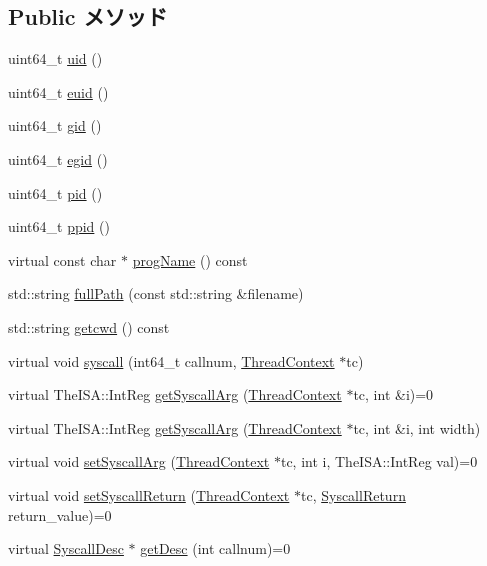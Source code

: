 \subsection*{Public メソッド}
\begin{DoxyCompactItemize}
\item 
uint64\_\-t \hyperlink{classLiveProcess_aa371c162844c3023c2c2c98913267482}{uid} ()
\item 
uint64\_\-t \hyperlink{classLiveProcess_a37002dbf259d35128485c6014a0c2fd9}{euid} ()
\item 
uint64\_\-t \hyperlink{classLiveProcess_aa71ba391e05d5e24c3623f7f21edaa74}{gid} ()
\item 
uint64\_\-t \hyperlink{classLiveProcess_a0868ad9fa2d15bdaa033a861d2448edc}{egid} ()
\item 
uint64\_\-t \hyperlink{classLiveProcess_a8bce5535a19cd849d89dacf166319a1a}{pid} ()
\item 
uint64\_\-t \hyperlink{classLiveProcess_a4c1e9134209da61d2f8edc374a94f327}{ppid} ()
\item 
virtual const char $\ast$ \hyperlink{classLiveProcess_a580745d5543eb666c37e2a5f37fb32a0}{progName} () const 
\item 
std::string \hyperlink{classLiveProcess_a9c94a4c8c47961ea420f67ad43c4a5e5}{fullPath} (const std::string \&filename)
\item 
std::string \hyperlink{classLiveProcess_aba6680a83910e09f666106e67bc10c3b}{getcwd} () const 
\item 
virtual void \hyperlink{classLiveProcess_a1ed38802271de4269c3adfa46c73e7e7}{syscall} (int64\_\-t callnum, \hyperlink{classThreadContext}{ThreadContext} $\ast$tc)
\item 
virtual TheISA::IntReg \hyperlink{classLiveProcess_aa001ff57ec460026facb89ba19c7bf96}{getSyscallArg} (\hyperlink{classThreadContext}{ThreadContext} $\ast$tc, int \&i)=0
\item 
virtual TheISA::IntReg \hyperlink{classLiveProcess_a383f46521b8667b58a1275f2a3e2fda1}{getSyscallArg} (\hyperlink{classThreadContext}{ThreadContext} $\ast$tc, int \&i, int width)
\item 
virtual void \hyperlink{classLiveProcess_a0f596ddb560a15ade4257db3a6c9dd44}{setSyscallArg} (\hyperlink{classThreadContext}{ThreadContext} $\ast$tc, int i, TheISA::IntReg val)=0
\item 
virtual void \hyperlink{classLiveProcess_a5955e790542b86589b9fd75df24ec2d3}{setSyscallReturn} (\hyperlink{classThreadContext}{ThreadContext} $\ast$tc, \hyperlink{classSyscallReturn}{SyscallReturn} return\_\-value)=0
\item 
virtual \hyperlink{classSyscallDesc}{SyscallDesc} $\ast$ \hyperlink{classLiveProcess_a478f396f8895ef7728d26866a00121d7}{getDesc} (int callnum)=0
\end{DoxyCompactItemize}
